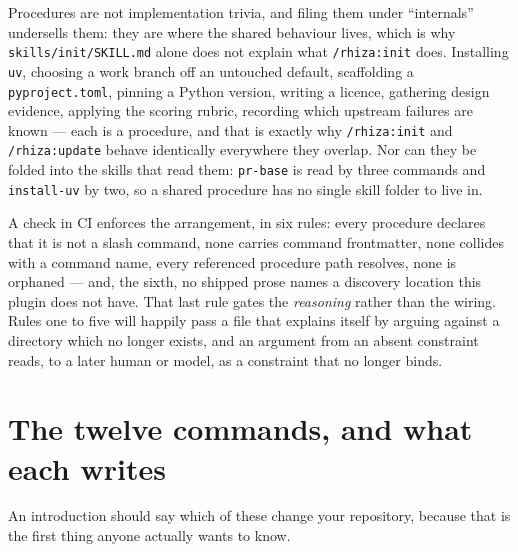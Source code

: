 \documentclass[11pt,a4paper]{article}
\newcommand{\cmd}[1]{\texttt{/rhiza:#1}}
\newcommand{\file}[1]{\texttt{#1}}
\begin{document}
\medskip
\noindent
Procedures are not implementation trivia, and filing them under ``internals'' undersells
them: they are where the shared behaviour lives, which is why
\file{skills/init/SKILL.md} alone does
not explain what \cmd{init} does. Installing \texttt{uv}, choosing a work branch off an
untouched default, scaffolding a \file{pyproject.toml}, pinning a Python version, writing
a licence, gathering design evidence, applying the scoring rubric, recording which
upstream failures are known --- each is a procedure, and that is
exactly why \cmd{init} and \cmd{update} behave identically everywhere they overlap. Nor
can they be folded into the skills that read them: \file{pr-base} is read by three
commands and \file{install-uv} by two, so a shared procedure has no single skill folder
to live in.

\medskip
\noindent
A check in CI enforces the arrangement, in six rules: every procedure declares that it
is not a slash command, none carries command frontmatter, none collides with a command
name, every referenced procedure path resolves, none is orphaned --- and, the sixth, no
shipped prose names a discovery location this plugin does not have. That last rule gates
the \emph{reasoning} rather than the wiring. Rules one to five will happily pass a file
that explains itself by arguing against a directory which no longer exists, and an
argument from an absent constraint reads, to a later human or model, as a constraint that
no longer binds.

\section{The twelve commands, and what each writes}

An introduction should say which of these change your repository, because that is the
first thing anyone actually wants to know.
\end{document}
